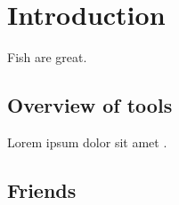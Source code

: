 \chapter{Introduction}


Fish are great.

\section{Overview of tools}

Lorem ipsum dolor sit amet \citep{paolo24satellite}.

\section{Friends}